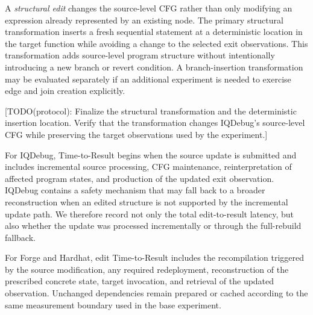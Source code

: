 \documentclass[11pt,oneside]{report}
\theoremstyle{plain}
\theoremstyle{definition}
\theoremstyle{remark}
\begin{document}
A \textit{structural edit} changes the source-level CFG rather than only modifying an expression already represented by an existing node. The primary structural transformation inserts a fresh sequential statement at a deterministic location in the target function while avoiding a change to the selected exit observations. This transformation adds source-level program structure without intentionally introducing a new branch or revert condition. A branch-insertion transformation may be evaluated separately if an additional experiment is needed to exercise edge and join creation explicitly.

[TODO(protocol): Finalize the structural transformation and the deterministic insertion location. Verify that the transformation changes IQDebug's source-level CFG while preserving the target observations used by the experiment.]

For IQDebug, Time-to-Result begins when the source update is submitted and includes incremental source processing, CFG maintenance, reinterpretation of affected program states, and production of the updated exit observation. IQDebug contains a safety mechanism that may fall back to a broader reconstruction when an edited structure is not supported by the incremental update path. We therefore record not only the total edit-to-result latency, but also whether the update was processed incrementally or through the full-rebuild fallback.

For Forge and Hardhat, edit Time-to-Result includes the recompilation triggered by the source modification, any required redeployment, reconstruction of the prescribed concrete state, target invocation, and retrieval of the updated observation. Unchanged dependencies remain prepared or cached according to the same measurement boundary used in the base experiment.
\end{document}
